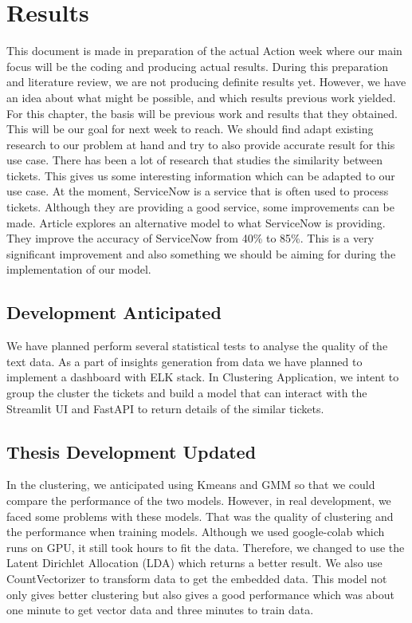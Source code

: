 \documentclass[a4paper,12pt]{report}
\begin{document}
    \chapter{Results}
    This document is made in preparation of the actual Action week where our main focus will be the coding and producing actual results. During this preparation and literature review, we are not producing definite results yet. However, we have an idea about what might be possible, and which results previous work yielded. For this chapter, the basis will be previous work and results that they obtained. This will be our goal for next week to reach. We should find adapt existing research to our problem at hand and try to also provide accurate result for this use case.
    \newline\newline
    There has been a lot of research that studies the similarity between tickets. This gives us some interesting information which can be adapted to our use case. At the moment, ServiceNow is a service that is often used to process tickets. Although they are providing a good service, some improvements can be made. Article\cite{Garrett2020} explores an alternative model to what ServiceNow is providing. They improve the accuracy of ServiceNow from 40\% to 85\%. This is a very significant improvement and also something we should be aiming for during the implementation of our model.

    \section{Development Anticipated}
    We have planned perform several statistical tests to analyse the quality of the text data.
    As a part of insights generation from data we have planned to implement a dashboard with ELK stack. In Clustering Application, we intent to group the cluster the tickets and build a model that can interact with the Streamlit UI and FastAPI to return details of the similar tickets.

    \section{Thesis Development Updated}
    In the clustering, we anticipated using Kmeans and GMM so that we could compare the performance of the two models. However, in real development, we faced some problems with these models. That was the quality of clustering and the performance when training models. Although we used google-colab which runs on GPU, it still took hours to fit the data.
    Therefore, we changed to use the Latent Dirichlet Allocation (LDA) which returns a better result. We also use CountVectorizer to transform data to get the embedded data. This model not only gives better clustering but also gives a good performance which was about one minute to get vector data and three minutes to train data.
    
\end{document}
